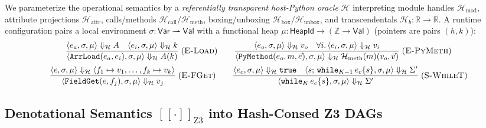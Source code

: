 \documentclass[11pt,a4paper]{article}
\newcommand{\sem}[1]{[\![#1]\!]}
\begin{document}
We parameterize the operational semantics by a \emph{referentially transparent host-Python oracle} $\mathcal{H}$ interpreting module handles $\mathcal{H}_{\text{mod}}$, attribute projections $\mathcal{H}_{\text{attr}}$, calls/methods $\mathcal{H}_{\text{call}}/\mathcal{H}_{\text{meth}}$, boxing/unboxing $\mathcal{H}_{\text{box}}/\mathcal{H}_{\text{unbox}}$, and transcendentals $\mathcal{H}_b : \mathbb{R} \to \mathbb{R}$. A runtime configuration pairs a local environment $\sigma : \mathsf{Var} \rightharpoonup \mathsf{Val}$ with a functional heap $\mu : \mathsf{HeapId} \to (\mathbb{Z} \to \mathsf{Val})$ (pointers are pairs $(\mathit{h}, k)$):
\[
\frac{\langle e_a, \sigma, \mu \rangle \Downarrow_{\mathcal{H}} A \quad \langle e_i, \sigma, \mu \rangle \Downarrow_{\mathcal{H}} k}{\langle \texttt{ArrLoad}(e_a, e_i), \sigma, \mu \rangle \Downarrow_{\mathcal{H}} A(k)}\;(\textsc{E-Load})
\qquad
\frac{\langle e_o, \sigma, \mu \rangle \Downarrow_{\mathcal{H}} v_o \quad \forall i.\,\langle e_i, \sigma, \mu \rangle \Downarrow_{\mathcal{H}} v_i}{\langle \texttt{PyMethod}(e_o, m, \vec{e}), \sigma, \mu \rangle \Downarrow_{\mathcal{H}} \mathcal{H}_{\text{meth}}(m)(v_o, \vec{v})}\;(\textsc{E-PyMeth})
\]
\[
\frac{\langle e, \sigma, \mu \rangle \Downarrow_{\mathcal{H}} \langle f_1 \mapsto v_1, \dots, f_k \mapsto v_k \rangle}{\langle \texttt{FieldGet}(e, f_j), \sigma, \mu \rangle \Downarrow_{\mathcal{H}} v_j}\;(\textsc{E-FGet})
\qquad
\frac{\langle e_c, \sigma, \mu \rangle \Downarrow_{\mathcal{H}} \texttt{true} \quad \langle s;\,\texttt{while}_{K-1}\,e_c\{s\}, \sigma, \mu \rangle \Downarrow_{\mathcal{H}} \Sigma'}{\langle \texttt{while}_K\,e_c\{s\}, \sigma, \mu \rangle \Downarrow_{\mathcal{H}} \Sigma'}\;(\textsc{S-WhileT})
\]

\subsection{Denotational Semantics $\sem{\cdot}_{\text{Z3}}$ into Hash-Consed Z3 DAGs}
\end{document}
